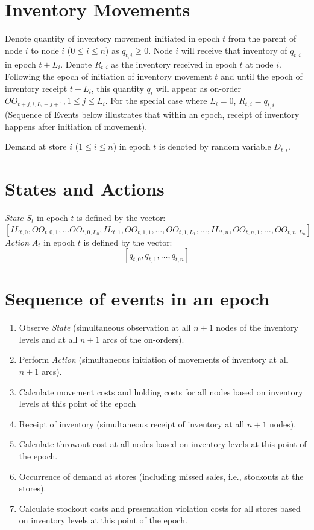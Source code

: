 \documentclass[12pt]{amsart}
\begin{document}
\section{Inventory Movements}
Denote quantity of inventory movement initiated in epoch $t$ from the parent of node $i$ to node $i$ ($0 \leq i \leq n$) as $q_{t,i} \geq 0$. Node $i$ will receive that inventory of $q_{t,i}$ in epoch $t + L_i$. Denote $R_{t,i}$ as the inventory received in epoch $t$ at node $i$. Following the epoch of initiation of inventory movement $t$ and until the epoch of inventory receipt $t + L_i$, this quantity $q_i$ will appear as on-order $OO_{t+j,i,L_i-j+1}, 1 \leq j \leq L_i$. For the special case where $L_i = 0$, $R_{t,i} = q_{t,i}$ (Sequence of Events below illustrates that within an epoch, receipt of inventory happens after initiation of movement).

Demand at store $i$ ($1 \leq i \leq n$) in epoch $t$ is denoted by random variable $D_{t,i}$.

\section{States and Actions}
{\em State} $S_t$ in epoch $t$ is defined by the vector:
 $$[IL_{t,0}, OO_{t,0,1}, \ldots OO_{t,0, L_0}, IL_{t,1}, OO_{t,1,1}, \ldots, OO_{t,1,L_1}, \ldots, IL_{t,n}, OO_{t,n,1}, \dots, OO_{t,n, L_n}]$$
 {\em Action} $A_t$ in epoch $t$ is defined by the vector:
 $$[q_{t,0}, q_{t,1}, \ldots, q_{t,n}]$$


\section{Sequence of events in an epoch}

\begin{enumerate}
\item Observe {\em State} (simultaneous observation at all $n+1$ nodes of the inventory levels and at all $n+1$ arcs of the on-orders).
\item Perform {\em Action} (simultaneous initiation of movements of inventory at all $n+1$ arcs).
\item Calculate movement costs and holding costs for all nodes based on inventory levels at this point of the epoch
\item Receipt of inventory (simultaneous receipt of inventory at all $n+1$ nodes).
\item Calculate throwout cost at all nodes based on inventory levels at this point of the epoch. 
\item Occurrence of demand at stores (including missed sales, i.e., stockouts at the stores).
\item Calculate stockout costs and presentation violation costs for all stores based on inventory levels at this point of the epoch.
\end{enumerate}
\end{document}
